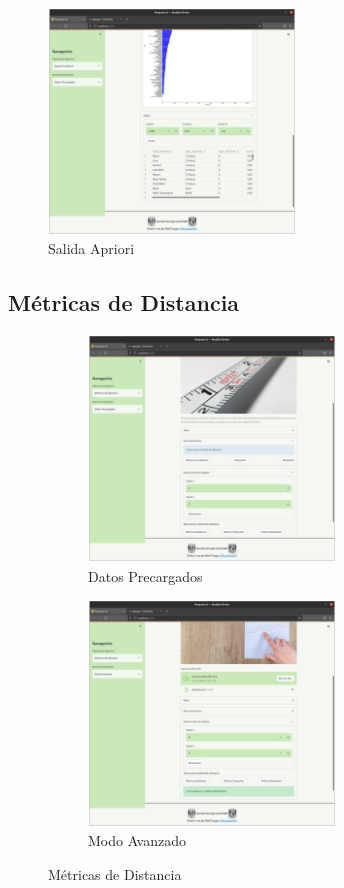 \documentclass[10pt]{article}
\begin{document}
    \begin{figure}[H]
    \centering
    \includegraphics[height=6cm]{img/AprioriSal.png}
    \caption{Salida Apriori}
    \label{fig:AprioriSalida}
    \end{figure}

\subsection{Métricas de Distancia}

    \begin{figure}[H]
    
    \begin{subfigure}{0.5\textwidth}
    \centering
    \includegraphics[height=6cm]{img/MetricasDP.png} 
    \caption{Datos Precargados}
    \label{fig:MetricasDP}
    \end{subfigure}
    \begin{subfigure}{0.5\textwidth}
    \centering
    \includegraphics[height=6cm]{img/MetricasMA.png}
    \caption{Modo Avanzado}
    \label{fig:MetricasMC}
    \end{subfigure}
    
    \caption{Métricas de Distancia}
    \label{fig:MetricasDistancia}
    \end{figure}
    
\end{document}
